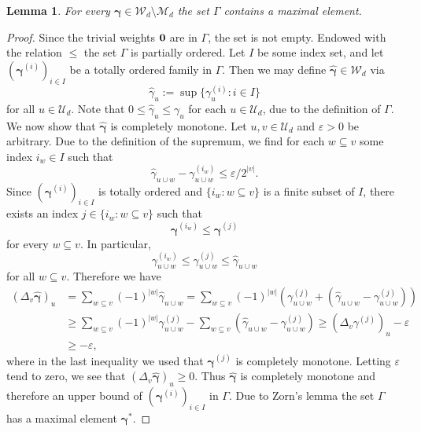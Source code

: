 \documentclass{article}
\newcommand{\eps}{\varepsilon}
\newcommand{\bg}{{\boldsymbol{\gamma}}}
\newcommand{\U}  {\mathcal{U}}
\newcommand{\W}  {\mathcal{W}}
\newcommand{\M}  {\mathcal{M}}
\theoremstyle{plain}
\newtheorem{lemma}{Lemma}
\theoremstyle{definition}
\begin{document}
\begin{lemma}\label{Lemma:Zorn}
For every $\bg \in \W_d \setminus \M_d$ the set
$\Gamma$ contains a maximal element.
\end{lemma}

\begin{proof}
Since the trivial weights ${\bf 0}$ are 
in $\Gamma$, the set is not empty. 
Endowed with the relation $\le$ the set $\Gamma$ is partially 
ordered. Let $I$ be some index set, and let 
$(\bg^{(i)})_{i\in I}$ be a totally ordered family in $\Gamma$. 
Then we may define $\widehat{\bg} \in \W_d$ via 
\[
\widehat{\gamma}_u := \sup \{\gamma^{(i)}_u : i \in I\}
\]
for all $u\in \U_d$. Note that 
$0 \le \widehat{\gamma}_u \le \gamma_u$ for each $u\in \U_d$, 
due to the definition of $\Gamma$. We now show that 
$\widehat{\bg}$ is completely monotone. Let $u, v\in \U_d$ and 
$\eps >0$ be arbitrary. Due to the definition of the supremum, 
we find for each $w\subseteq v$ some index $i_w\in I$ such that
\[
\widehat{\gamma}_{u\cup w} - \gamma^{(i_w)}_{u\cup w} 
\le \eps / 2^{|v|}.
\]
Since $(\bg^{(i)})_{i\in I}$ is totally ordered 
and $\{i_w : w\subseteq v\}$ is a finite subset of $I$, there 
exists an index $j \in \{i_w : w\subseteq v\}$ 
such that
\[
\bg^{(i_w)} \leq \bg^{(j)}
\]
for every $w \subseteq v$. In particular,
\[
\gamma^{(i_w)}_{u\cup w} \le 
\gamma^{(j)}_{u\cup w} \le \widehat{\gamma}_{u\cup w} 
\]
for all $w\subseteq v$. Therefore we have
\begin{equation*}
\begin{split}
\left( \Delta_v \widehat{\bg} \right)_u 
&= \sum_{w\subseteq v} (-1)^{|w|} \widehat{\gamma}_{u\cup w}
=  \sum_{w\subseteq v} (-1)^{|w|} \left(   \gamma^{(j)}_{u\cup w} 
+ \left( \widehat{\gamma}_{u\cup w} -  
\gamma^{(j)}_{u\cup w} \right) \right)\\
&\ge \sum_{w \subseteq v} (-1)^{|w|}  \gamma^{(j)}_{u\cup w} -  
\sum_{w \subseteq v}  
 \left( \widehat{\gamma}_{u\cup w} -  \gamma^{(j)}_{u\cup w} \right) 
\ge \left( \Delta_v \gamma^{(j)} \right)_u - \eps \\
&\ge  - \eps,
\end{split}
\end{equation*}
where in the last inequality we used that $\bg^{(j)}$ is completely 
monotone.
Letting $\eps$ tend to zero, we see that 
$\left( \Delta_v \widehat{\bg} \right)_u \ge 0$. Thus 
$\widehat{\bg}$ is completely monotone and therefore an 
upper bound of
$(\bg^{(i)})_{i\in I}$ in $\Gamma $. Due to Zorn's lemma the 
set $\Gamma $ has a maximal element $\bg^{\ast}$. 
\end{proof}
\end{document}
